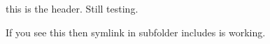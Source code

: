 this is the header. Still testing.

If you see this then symlink in subfolder includes is working.


